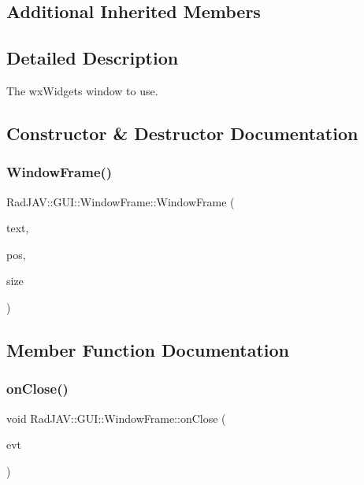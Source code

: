 \subsection*{Additional Inherited Members}


\subsection{Detailed Description}
The wx\+Widgets window to use. 

\subsection{Constructor \& Destructor Documentation}
\mbox{\label{class_rad_j_a_v_1_1_g_u_i_1_1_window_frame_a72f62c3d53cd2e7cdced3abd8e04d9f1}} 
\subsubsection{\texorpdfstring{Window\+Frame()}{WindowFrame()}}
{\footnotesize\ttfamily Rad\+J\+A\+V\+::\+G\+U\+I\+::\+Window\+Frame\+::\+Window\+Frame (\begin{DoxyParamCaption}\item[{const wx\+String \&}]{text,  }\item[{const wx\+Point \&}]{pos,  }\item[{const wx\+Size \&}]{size }\end{DoxyParamCaption})}



\subsection{Member Function Documentation}
\mbox{\label{class_rad_j_a_v_1_1_g_u_i_1_1_window_frame_a40bb6ff126e0a656ff4fdf4e00755479}} 
\subsubsection{\texorpdfstring{on\+Close()}{onClose()}}
{\footnotesize\ttfamily void Rad\+J\+A\+V\+::\+G\+U\+I\+::\+Window\+Frame\+::on\+Close (\begin{DoxyParamCaption}\item[{wx\+Close\+Event \&}]{evt }\end{DoxyParamCaption})}

